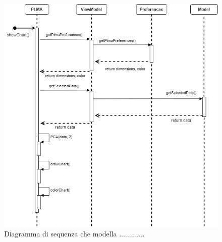 \newpage
\begin{figure}[hb]
\includegraphics[width=15.5cm]{Images/Allegato Tecnico-Sequenza-PLMA}
\centering
\caption{Diagramma di sequenza che modella .............}
\end{figure}
\newpage